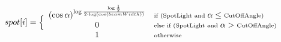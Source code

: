 \documentclass{article}
\begin{document}
$$
spot[i]=\Big\{
\begin{array}{clcr}
(\cos \alpha)^{\log \frac{\log \frac{1}{2}}{2 \cdot \log ( \cos (beamWidth))}} & \scriptsize \textrm{if (SpotLight and } \alpha \leq \textrm{CutOffAngle)} \\
0 & \scriptsize \textrm{else if (SpotLight and } \alpha > \textrm{CutOffAngle)} \\
1 & \scriptsize \textrm{otherwise}
\end{array}
$$
\end{document}
